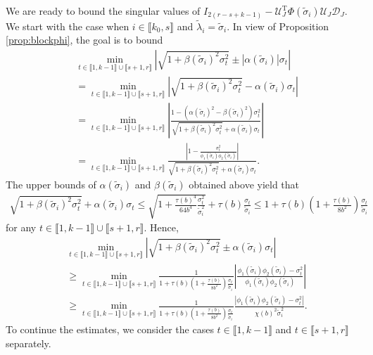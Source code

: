 \documentclass[reqno]{amsart}
\newcommand{\T}{\mathrm{T}}
\theoremstyle{plain}
\theoremstyle{definition}
\begin{document}
We are ready to bound the singular values of $I_{2(r-s+k-1)} - \mathcal U_J^\T \Phi(\widetilde \sigma_i) {\mathcal U}_J {\mathcal D}_J$. We start with the case when $i\in \llbracket k_0, s\rrbracket$ and $\widetilde \lambda_i = \widetilde \sigma_i$. In view of Proposition \ref{prop:blockphi}, the goal is to bound
\begingroup
\allowdisplaybreaks
\begin{align*}
&\min_{t\in \llbracket 1, k-1\rrbracket \cup \llbracket s+1, r\rrbracket} \left| \sqrt{1+\beta(\widetilde \sigma_i)^2 \sigma_t^2} \pm |\alpha(\widetilde \sigma_i)| \sigma_t \right|\\
&=\min_{t\in \llbracket 1, k-1\rrbracket \cup \llbracket s+1, r\rrbracket} \left| \sqrt{1+\beta(\widetilde \sigma_i)^2 \sigma_t^2} - \alpha(\widetilde \sigma_i) \sigma_t \right|\\
&=\min_{t\in \llbracket 1, k-1\rrbracket \cup \llbracket s+1, r\rrbracket} \left| \frac{1-(\alpha(\widetilde \sigma_i)^2 -\beta(\widetilde \sigma_i)^2) \sigma_t^2}{\sqrt{1+\beta(\widetilde \sigma_i)^2 \sigma_t^2} + \alpha(\widetilde \sigma_i) \sigma_t}\right| \\
&=\min_{t\in \llbracket 1, k-1\rrbracket \cup \llbracket s+1, r\rrbracket} \frac{\left| 1- \frac{\sigma_t^2}{\phi_1(\widetilde\sigma_i)\phi_2(\widetilde\sigma_i)}\right|}{\sqrt{1+\beta(\widetilde \sigma_i)^2 \sigma_t^2} + \alpha(\widetilde \sigma_i) \sigma_t}.
\end{align*}
\endgroup
The upper bounds of $\alpha(\widetilde \sigma_i)$ and $\beta(\widetilde \sigma_i) $ obtained above yield that
\begin{align*}
\sqrt{1+\beta(\widetilde \sigma_i)^2 \sigma_t^2} + \alpha(\widetilde \sigma_i) \sigma_t \le \sqrt{1+ \frac{\tau(b)^4}{64b^4} \frac{\sigma_t^2}{\widetilde\sigma_i^2}} + \tau(b)\frac{\sigma_t}{\widetilde\sigma_i} \le 1+\tau(b)\left(1 +\frac{\tau(b)}{8b^2} \right)\frac{\sigma_t}{\widetilde \sigma_i}
\end{align*}
for any $t\in \llbracket 1, k-1\rrbracket \cup \llbracket s+1, r\rrbracket$. Hence, 
\begin{align*}
&\min_{t\in \llbracket 1, k-1\rrbracket \cup \llbracket s+1, r\rrbracket} \left| \sqrt{1+\beta(\widetilde \sigma_i)^2 \sigma_t^2} \pm \alpha(\widetilde \sigma_i) \sigma_t \right|\\
& \ge\min_{t\in \llbracket 1, k-1\rrbracket \cup \llbracket s+1, r\rrbracket} \frac{1}{1+\tau(b)\left(1 +\frac{\tau(b)}{8b^2} \right)\frac{\sigma_t}{\widetilde \sigma_i}
}\left|  \frac{\phi_1(\widetilde\sigma_i)\phi_2(\widetilde\sigma_i)-\sigma_t^2}{\phi_1(\widetilde\sigma_i)\phi_2(\widetilde\sigma_i)}\right|\\
&\ge \min_{t\in \llbracket 1, k-1\rrbracket \cup \llbracket s+1, r\rrbracket}\frac{1}{1+\tau(b)\left(1 +\frac{\tau(b)}{8b^2} \right)\frac{\sigma_t}{\widetilde \sigma_i}
} \frac{|\phi_1(\widetilde\sigma_i)\phi_2(\widetilde\sigma_i)-\sigma_t^2|}{ \chi(b)^2\widetilde\sigma_i^2}.
\end{align*}
 To continue the estimates, we consider the cases $t\in \llbracket 1, k-1\rrbracket$ and $t\in \llbracket s+1, r\rrbracket$ separately. 
\end{document}
